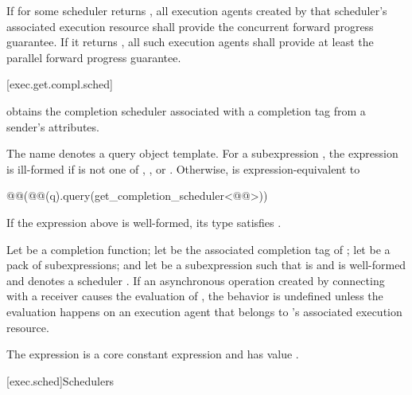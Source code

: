 \pnum
If  for some scheduler 
returns ,
all execution agents created by that scheduler's associated execution resource
shall provide the concurrent forward progress guarantee.
If it returns ,
all such execution agents
shall provide at least the parallel forward progress guarantee.

[exec.get.compl.sched]{}

\pnum
{} obtains
the completion scheduler associated with a completion tag
from a sender's attributes.

\pnum
The name  denotes a query object template.
For a subexpression ,
the expression 
is ill-formed if  is not one of
, , or .
Otherwise, 
is expression-equivalent to
\begin{codeblock}
@@(@@(q).query(get_completion_scheduler<@@>))
\end{codeblock}
\mandates
If the expression above is well-formed,
its type satisfies .

\pnum
Let  be a completion function;
let  be
the associated completion tag of ;
let  be a pack of subexpressions; and
let  be a subexpression
such that  is  and
is well-formed and denotes a scheduler .
If an asynchronous operation
created by connecting  with a receiver 
causes the evaluation of ,
the behavior is undefined
unless the evaluation happens on an execution agent
that belongs to 's associated execution resource.

\pnum
The expression
is a core constant expression and has value .

[exec.sched]{Schedulers}

